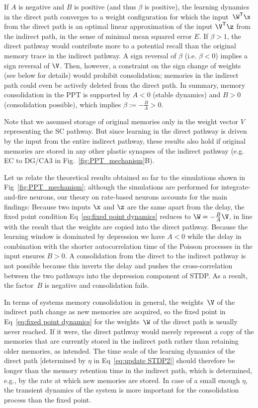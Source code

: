 \noindent
If $A$ is negative and $B$ is positive (and thus $\beta$ is positive), the learning dynamics in the direct path converges to a weight configuration for which the input~$\W^\mathsf{T} \x$ from the direct path is an optimal linear approximation of the input $\V^\mathsf{T} \z$ from the indirect path, in the sense of minimal mean squared error $E$.
If $\beta>1$, the direct pathway would contribute more to a potential recall than the original memory trace in the indirect pathway.
A sign reversal of $\beta$ (i.e. $\beta<0$) implies a sign reversal of $\V$.
Then, however, a constraint on the sign change of weights (see below for details) would prohibit consolidation; memories in the indirect path could even be actively deleted from the direct path. In summary, memory consolidation in the PPT is supported by $A<0$ (stable dynamics) and $B>0$ (consolidation possible), which implies $\beta:= - \frac{B}{A} >0$.

Note that we assumed storage of original memories only in the weight vector $V$ representing the SC pathway. But since learning in the direct pathway is driven by the input from the entire indirect pathway, these results also hold if original memories are stored in any other plastic synapses of the indirect pathway (e.g. EC to DG/CA3 in Fig.~\ref{fig:PPT_mechanism}B).

Let us relate the theoretical results obtained so far to  the simulations shown in Fig~\ref{fig:PPT_mechanism}; although the simulations are performed for integrate-and-fire neurons, our theory on rate-based neurons accounts for the main findings: Because two inputs $\x$ and $\z$ are the same apart from the delay, the fixed point condition Eq~\eqref{eq:fixed point dynamics}  reduces to $\W = -\frac{B} {A} \V$, in line with the result that the weights are copied into the direct pathway. Because the learning window is dominated by depression we have $A<0$ while the delay in combination with the shorter autocorrelation time of the Poisson processes in the input ensures $B>0$. A consolidation from the direct to the indirect pathway is not possible because this inverts the delay and pushes the cross-correlation between the two pathways into the depression component of STDP. As a result, the factor~$B$ is negative and consolidation fails.

In terms of systems memory consolidation in general, the weights~$\V$ of the indirect path change as new memories are acquired, so the fixed point in Eq~\eqref{eq:fixed point dynamics} for the weights~$\W$ of the direct path is usually never reached. If it were, the direct pathway would merely represent a copy of the memories that are currently stored in the indirect path rather than retaining older memories, as intended. The time scale of the learning dynamics of the direct path [determined by $\eta$ in Eq~\eqref{eq:update STDP2}] should therefore be longer than the memory retention time in the indirect path, which is determined, e.g., by the rate at which new memories are stored. In case of a small enough $\eta$, the transient dynamics of the system is more important for the consolidation process than the fixed point.

